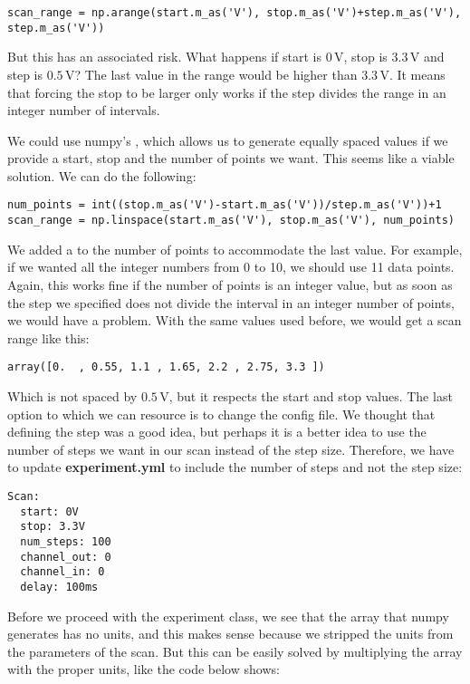 \begin{verbatim}
scan_range = np.arange(start.m_as('V'), stop.m_as('V')+step.m_as('V'), step.m_as('V'))
\end{verbatim}

But this has an associated risk. What happens if start is $0\,\textrm{V}$, stop is $3.3\,\textrm{V}$ and step is $0.5\,\textrm{V}$? The last value in the range would be higher than $3.3\,\textrm{V}$. It means that forcing the stop to be larger only works if the step divides the range in an integer number of intervals.

We could use numpy's , which allows us to generate equally spaced values if we provide a start, stop and the number of points we want. This seems like a viable solution. We can do the following:

\begin{verbatim}
num_points = int((stop.m_as('V')-start.m_as('V'))/step.m_as('V'))+1
scan_range = np.linspace(start.m_as('V'), stop.m_as('V'), num_points)
\end{verbatim}

We added a  to the number of points to accommodate the last value. For example, if we wanted all the integer numbers from 0 to 10, we should use 11 data points. Again, this works fine if the number of points is an integer value, but as soon as the step we specified does not divide the interval in an integer number of points, we would have a problem. With the same values used before, we would get a scan range like this:

\begin{verbatim}
array([0.  , 0.55, 1.1 , 1.65, 2.2 , 2.75, 3.3 ])
\end{verbatim}

Which is not spaced by $0.5\,\textrm{V}$, but it respects the start and stop values. The last option to which we can resource is to change the config file. We thought that defining the step was a good idea, but perhaps it is a better idea to use the number of steps we want in our scan instead of the step size. Therefore, we have to update \textbf{experiment.yml} to include the number of steps and not the step size:

\begin{verbatim}
Scan:
  start: 0V
  stop: 3.3V
  num_steps: 100
  channel_out: 0
  channel_in: 0
  delay: 100ms
\end{verbatim}

Before we proceed with the experiment class, we see that the array that numpy generates has no units, and this makes sense because we stripped the units from the parameters of the scan. But this can be easily solved by multiplying the array with the proper units, like the code below shows:

